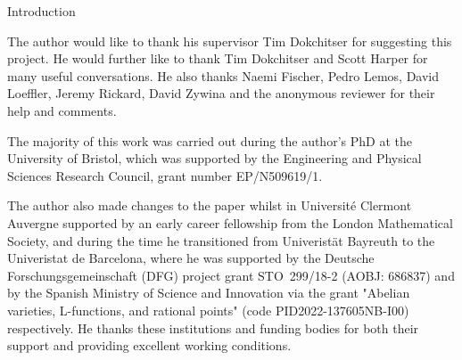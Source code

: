 \documentclass[11pt,a4paper]{article}
\begin{document}
\begin{section}{Introduction}
\begin{acknowledgements}
The author would like to thank his supervisor Tim Dokchitser for suggesting this project. He would further like to thank Tim Dokchitser and Scott Harper for many useful conversations.
He also thanks Naemi Fischer, Pedro Lemos, David Loeffler, Jeremy Rickard, David Zywina and the anonymous reviewer for their help and comments.

The majority of this work was carried out during the author's PhD at the University of Bristol, which was supported by the Engineering and Physical Sciences Research Council, grant number EP/N509619/1.

The author also made changes to the paper whilst in Université Clermont Auvergne supported by an early career fellowship from the London Mathematical Society, and during the time he transitioned from Univeristät Bayreuth to the Univeristat de Barcelona, where he was supported by the Deutsche Forschungsgemeinschaft (DFG) project grant STO~299/18-2 (AOBJ: 686837) and by the Spanish Ministry of Science and Innovation via the grant "Abelian varieties, L-functions, and rational points" (code PID2022-137605NB-I00) respectively.
He thanks these institutions and funding bodies for both their support and providing excellent working conditions.

\end{acknowledgements}

    
\end{section}
\end{document}
